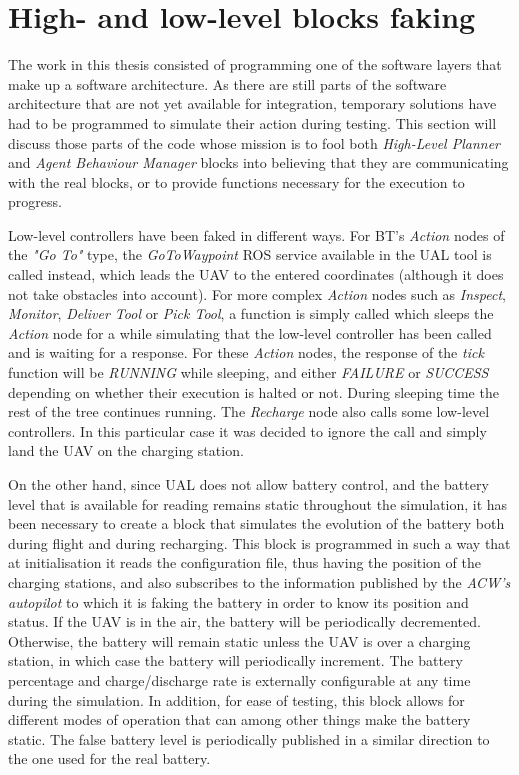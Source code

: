 \documentclass[fontsize=11pt, English=false, Español=true, Myfinal=true, twoside, numbers=noenddot]{scrbook}
\begin{document}
\section{High- and low-level blocks faking}
\label{sec:faking}
The work in this thesis consisted of programming one of the software layers that make up a software architecture. As there are still parts of the software architecture that are not yet available for integration, temporary solutions have had to be programmed to simulate their action during testing. This section will discuss those parts of the code whose mission is to fool both \emph{High-Level Planner} and \emph{Agent Behaviour Manager} blocks into believing that they are communicating with the real blocks, or to provide functions necessary for the execution to progress.

Low-level controllers have been faked in different ways. For \gls{BT}'s \emph{Action} nodes of the \emph{"Go To"} type, the \emph{GoToWaypoint} \gls{ROS} service available in the \gls{UAL} tool is called instead, which leads the \gls{UAV} to the entered coordinates (although it does not take obstacles into account). For more complex \emph{Action} nodes such as \emph{Inspect}, \emph{Monitor}, \emph{Deliver Tool} or \emph{Pick Tool}, a function is simply called which sleeps the \emph{Action} node for a while simulating that the low-level controller has been called and is waiting for a response. For these \emph{Action} nodes, the response of the \emph{tick} function will be \emph{RUNNING} while sleeping, and either \emph{FAILURE} or \emph{SUCCESS} depending on whether their execution is halted or not. During sleeping time the rest of the tree continues running. The \emph{Recharge} node also calls some low-level controllers. In this particular case it was decided to ignore the call and simply land the \gls{UAV} on the charging station.

On the other hand, since \gls{UAL} does not allow battery control, and the battery level that is available for reading remains static throughout the simulation, it has been necessary to create a block that simulates the evolution of the battery both during flight and during recharging. This block is programmed in such a way that at initialisation it reads the configuration file, thus having the position of the charging stations, and also subscribes to the information published by the \emph{\gls{ACW}'s autopilot} to which it is faking the battery in order to know its position and status. If the \gls{UAV} is in the air, the battery will be periodically decremented. Otherwise, the battery will remain static unless the \gls{UAV} is over a charging station, in which case the battery will periodically increment. The battery percentage and charge/discharge rate is externally configurable at any time during the simulation. In addition, for ease of testing, this block allows for different modes of operation that can among other things make the battery static. The false battery level is periodically published in a similar direction to the one used for the real battery.
\end{document}
